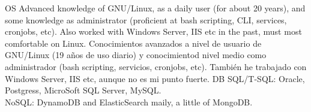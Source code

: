 \cvcomputer
    {OS}
        {\ml
            {Advanced knowledge of GNU/Linux, as a daily user (for about 20
            years), and some knowledge as administrator (proficient at bash
            scripting, CLI, services, cronjobs, etc). Also worked with Windows
            Server, IIS etc in the past, must most comfortable on Linux.}
            {Conocimientos avanzados a nivel de usuario de GNU/Linux (19 años
            de uso diario) y conocimientod nivel medio como administrador (bash
            scripting, servicios, cronjobs, etc). También he trabajado con
            Windows Server, IIS etc, aunque no es mi punto fuerte.}
        }
    {DB}
        {SQL/T-SQL: Oracle, Postgress, MicroSoft SQL Server, MySQL. \\ NoSQL:
        DynamoDB and ElasticSearch maily, a little of MongoDB.}
